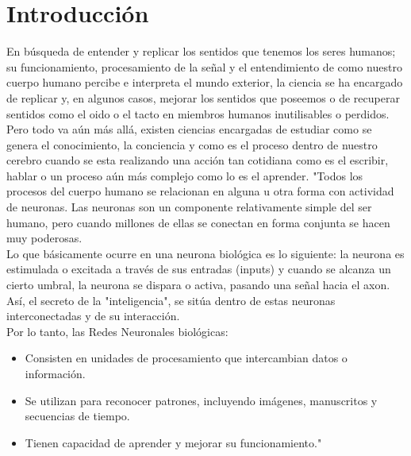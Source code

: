 \documentclass[conference]{IEEEtran}
\begin{document}
\section{Introducción}
En búsqueda  de entender y replicar los sentidos que tenemos los seres humanos; su funcionamiento, procesamiento de la señal y el entendimiento de como nuestro cuerpo humano percibe e interpreta el mundo exterior, la ciencia se ha encargado de replicar y, en algunos casos, mejorar los sentidos que poseemos o de recuperar sentidos como el oido o el tacto en miembros humanos inutilisables o perdidos. Pero todo va aún más allá, existen ciencias encargadas de estudiar como se genera el conocimiento, la conciencia y como es el proceso dentro de nuestro cerebro cuando se esta realizando una acción tan cotidiana como es el escribir, hablar o un proceso aún más complejo como lo es el aprender. "Todos los procesos del cuerpo humano se relacionan en alguna u otra forma con actividad de neuronas. Las neuronas son un componente relativamente simple del ser humano, pero cuando millones de ellas se conectan en forma conjunta se hacen muy poderosas. \\
Lo que básicamente ocurre en una neurona biológica es lo siguiente: la neurona es estimulada o excitada a través de sus entradas (inputs) y cuando se alcanza un cierto umbral, la neurona se dispara o activa, pasando una señal hacia el axon. Así, el secreto de la "inteligencia", se sitúa dentro de estas neuronas interconectadas y de su interacción.\\

Por lo tanto, las Redes Neuronales biológicas:

\begin{itemize}
	\item Consisten en unidades de procesamiento que intercambian datos o información.
	\item Se utilizan para reconocer patrones, incluyendo imágenes, manuscritos y secuencias de tiempo.
	\item Tienen capacidad de aprender y mejorar su funcionamiento." \cite{walter}
\end{itemize}
\end{document}
